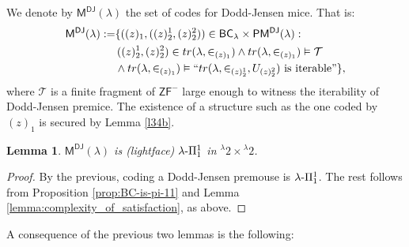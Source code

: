 \documentclass{amsart}
\numberwithin{equation}{section}
\def\hyp{{\hbox{-}}}
\newtheorem{lemma}[theorem]{Lemma}
\theoremstyle{definition}
\theoremstyle{remark}
\begin{document}
We denote by $\mathsf{M^{DJ}}(\lambda)$ the set of codes for Dodd-Jensen mice. That is:
\begin{equation*}
	\begin{split}
		\mathsf{M^{DJ}}(\lambda):=&\{((z)_{1},((z)^1_2,(z)^2_2))\in\mathsf{BC}_{\lambda}\times\mathsf{PM^{DJ}}(\lambda):\\&\,((z)^1_2,(z)^2_2)\in tr(\lambda,\in_{(z)_1})\wedge tr(\lambda,\in_{(z)_{1}})\vDash\mathcal{T}\\&\wedge tr(\lambda,\in_{(z)_{1}})\vDash``tr(\lambda,\in_{(z)^1_2},U_{(z)^2_2})\text{ is iterable}"\},
	\end{split}
\end{equation*}
where $\mathcal{T}$ is a finite fragment of $\mathsf{ZF^{-}}$ large enough to witness the iterability of Dodd-Jensen premice. The existence of a structure such as the one coded by $(z)_{1}$ is secured by Lemma \ref{l34b}.


\begin{lemma}\label{PM}  $\mathsf{M^{DJ}}(\lambda)$ is \emph{(lightface)} $\lambda\hyp\Pi^1_1$ in ${}^\lambda 2\times{}^{\lambda}2$.
\end{lemma}
\begin{proof}
    By the previous, coding a Dodd-Jensen premouse is $\lambda\hyp\Pi^1_1$. The rest follows from Proposition \ref{prop:BC-is-pi-11} and Lemma \ref{lemma:complexity_of_satisfaction}, as above.
\end{proof}

A consequence of the previous two lemmas is the following:
\end{document}
